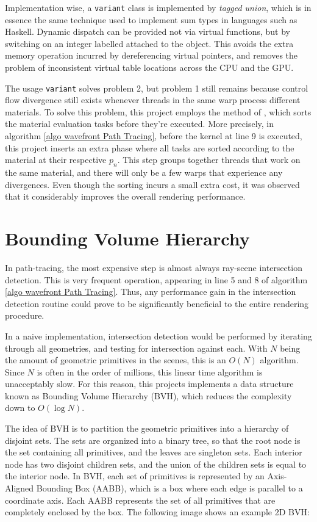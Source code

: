 Implementation wise, a \texttt{variant} class is implemented by \textit{tagged union}, which is in essence the same technique used to implement sum types in languages such as Haskell. Dynamic dispatch can be provided not via virtual functions, but by switching on an integer labelled attached to the object. This avoids the extra memory operation incurred by dereferencing virtual pointers, and removes the problem of inconsistent virtual table locations across the CPU and the GPU.

The usage \texttt{variant} solves problem 2, but problem 1 still remains because control flow divergence still exists whenever threads in the same warp process different materials. To solve this problem, this project employs the method of \cite{megakernel}, which sorts the material evaluation tasks before they're executed. More precisely, in algorithm \ref{algo wavefront Path Tracing}, before the kernel at line 9 is executed, this project inserts an extra phase where all tasks are sorted according to the material at their respective $p_n$. This step groups together threads that work on the same material, and there will only be a few warps that experience any divergences. Even though the sorting incurs a small extra cost, it was observed that it considerably improves the overall rendering performance.



\section{Bounding Volume Hierarchy}
In path-tracing, the most expensive step is almost always ray-scene intersection detection. This is very frequent operation, appearing in line 5 and 8 of algorithm \ref{algo wavefront Path Tracing}. Thus, any performance gain in the intersection detection routine could prove to be significantly beneficial to the entire rendering procedure. 

In a naive implementation, intersection detection would be performed by iterating through all geometries, and testing for intersection against each. With $N$ being the amount of geometric primitives in the scenes, this is an $O(N)$ algorithm. Since $N$ is often in the order of millions, this linear time algorithm is unacceptably slow. For this reason, this projects implements a data structure known as Bounding Volume Hierarchy (BVH), which reduces the complexity down to $O(\log N)$.

The idea of BVH is to partition the geometric primitives into a hierarchy of disjoint sets. The sets are organized into a binary tree, so that the root node is the set containing all primitives, and the leaves are singleton sets. Each interior node has two disjoint children sets, and the union of the children sets is equal to the interior node. In BVH, each set of primitives is represented by an Axis-Aligned Bounding Box (AABB), which is a box where each edge is parallel to a coordinate axis. Each AABB represents the set of all primitives that are completely enclosed by the box. The following image shows an example 2D BVH:


